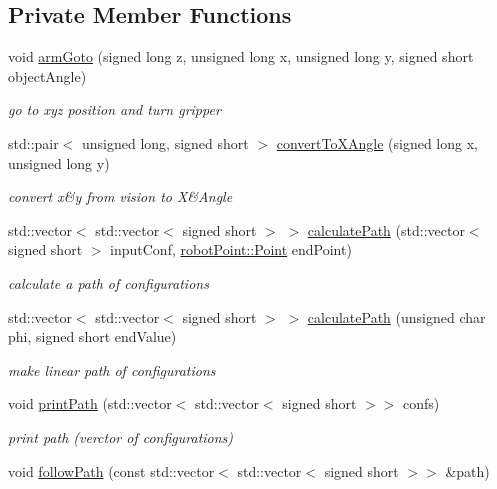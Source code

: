 \subsection*{Private Member Functions}
\begin{DoxyCompactItemize}
\item 
void \hyperlink{class_robotic_arm_a0d6a6dce0875c8540e5589c47aab5be3}{arm\+Goto} (signed long z, unsigned long x, unsigned long y, signed short object\+Angle)
\begin{DoxyCompactList}\small\item\em go to xyz position and turn gripper \end{DoxyCompactList}\item 
std\+::pair$<$ unsigned long, signed short $>$ \hyperlink{class_robotic_arm_a6ca035bd87d2c0cb1a6f7f040ad0ed52}{convert\+To\+X\+Angle} (signed long x, unsigned long y)
\begin{DoxyCompactList}\small\item\em convert x\&y from vision to X\&Angle \end{DoxyCompactList}\item 
std\+::vector$<$ std\+::vector$<$ signed short $>$ $>$ \hyperlink{class_robotic_arm_ae925ea4c5ea53ca359399a07d0ef4f76}{calculate\+Path} (std\+::vector$<$ signed short $>$ input\+Conf, \hyperlink{structrobot_point_1_1_point}{robot\+Point\+::\+Point} end\+Point)
\begin{DoxyCompactList}\small\item\em calculate a path of configurations \end{DoxyCompactList}\item 
std\+::vector$<$ std\+::vector$<$ signed short $>$ $>$ \hyperlink{class_robotic_arm_a71b4a844f3bc02bb36d6c18d808b80ce}{calculate\+Path} (unsigned char phi, signed short end\+Value)
\begin{DoxyCompactList}\small\item\em make linear path of configurations \end{DoxyCompactList}\item 
void \hyperlink{class_robotic_arm_a86204f659fe875af142cc1d817e562bf}{print\+Path} (std\+::vector$<$ std\+::vector$<$ signed short $>$$>$ confs)
\begin{DoxyCompactList}\small\item\em print path (verctor of configurations) \end{DoxyCompactList}\item 
void \hyperlink{class_robotic_arm_a976b1c8a1f85f64818182490073d4c5c}{follow\+Path} (const std\+::vector$<$ std\+::vector$<$ signed short $>$$>$ \&path)

\end{DoxyCompactItemize}
